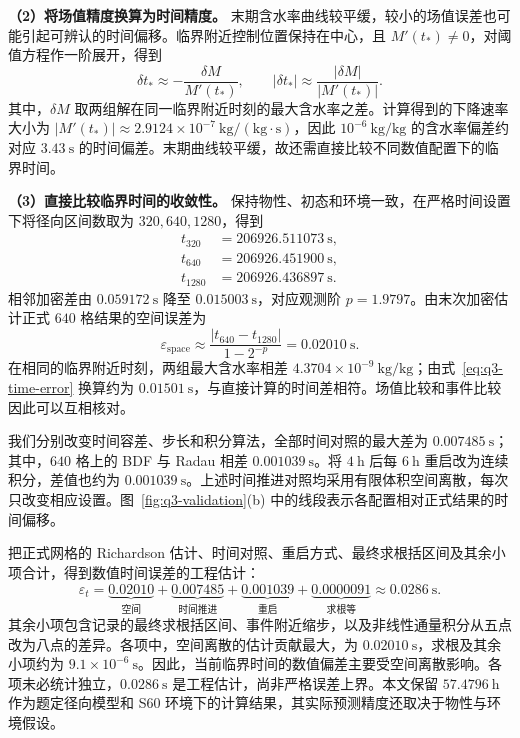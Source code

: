 \documentclass[UTF8,a4paper]{ctexart}
\begin{document}
\noindent\textbf{（2）将场值精度换算为时间精度。}
末期含水率曲线较平缓，较小的场值误差也可能引起可辨认的时间偏移。临界附近控制位置保持在中心，且 \(M'(t_*)\ne0\)，对阈值方程作一阶展开，得到
\begin{equation}
\delta t_*\approx-\frac{\delta M}{M'(t_*)},\qquad
|\delta t_*|\approx\frac{|\delta M|}{|M'(t_*)|}.
\label{eq:q3-time-error}
\end{equation}
其中，\(\delta M\) 取两组解在同一临界附近时刻的最大含水率之差。计算得到的下降速率大小为 \(|M'(t_*)|\approx2.9124\times10^{-7}~\mathrm{kg/(kg\cdot s)}\)，因此 \(10^{-6}~\mathrm{kg/kg}\) 的含水率偏差约对应 \(3.43~\mathrm s\) 的时间偏差。末期曲线较平缓，故还需直接比较不同数值配置下的临界时间。

\noindent\textbf{（3）直接比较临界时间的收敛性。}
保持物性、初态和环境一致，在严格时间设置下将径向区间数取为 \(320,640,1280\)，得到
\begin{equation}
\begin{aligned}
t_{320}&=206926.511073~\mathrm s,\\
t_{640}&=206926.451900~\mathrm s,\\
t_{1280}&=206926.436897~\mathrm s.
\end{aligned}
\label{eq:q3-event-convergence}
\end{equation}
相邻加密差由 \(0.059172~\mathrm s\) 降至 \(0.015003~\mathrm s\)，对应观测阶 \(p=1.9797\)。由末次加密估计正式 \(640\) 格结果的空间误差为
\[
\varepsilon_{\mathrm{space}}
\approx\frac{|t_{640}-t_{1280}|}{1-2^{-p}}
=0.02010~\mathrm s.
\]
在相同的临界附近时刻，两组最大含水率相差 \(4.3704\times10^{-9}~\mathrm{kg/kg}\)；由式~\eqref{eq:q3-time-error} 换算约为 \(0.01501~\mathrm s\)，与直接计算的时间差相符。场值比较和事件比较因此可以互相核对。

我们分别改变时间容差、步长和积分算法，全部时间对照的最大差为 \(0.007485~\mathrm s\)；其中，\(640\) 格上的 BDF 与 Radau 相差 \(0.001039~\mathrm s\)。将 \(4~\mathrm h\) 后每 \(6~\mathrm h\) 重启改为连续积分，差值也约为 \(0.001039~\mathrm s\)。上述时间推进对照均采用有限体积空间离散，每次只改变相应设置。图~\ref{fig:q3-validation}(b) 中的线段表示各配置相对正式结果的时间偏移。

把正式网格的 Richardson 估计、时间对照、重启方式、最终求根括区间及其余小项合计，得到数值时间误差的工程估计：
\begin{equation}
\widehat\varepsilon_t=
\underbrace{0.02010}_{\text{空间}}
+\underbrace{0.007485}_{\text{时间推进}}
+\underbrace{0.001039}_{\text{重启}}
+\underbrace{0.0000091}_{\text{求根等}}
\approx0.0286~\mathrm s.
\label{eq:q3-error-budget}
\end{equation}
其余小项包含记录的最终求根括区间、事件附近缩步，以及非线性通量积分从五点改为八点的差异。各项中，空间离散的估计贡献最大，为 \(0.02010~\mathrm s\)，求根及其余小项约为 \(9.1\times10^{-6}~\mathrm s\)。因此，当前临界时间的数值偏差主要受空间离散影响。各项未必统计独立，\(0.0286~\mathrm s\) 是工程估计，尚非严格误差上界。本文保留 \(57.4796~\mathrm h\) 作为题定径向模型和 S60 环境下的计算结果，其实际预测精度还取决于物性与环境假设。
\end{document}
